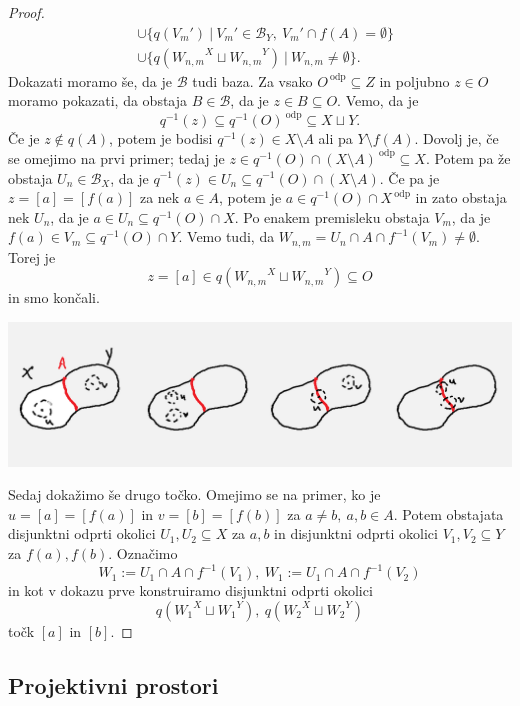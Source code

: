 \documentclass[10pt, a4paper]{article}
\newenvironment{noticeC}{%
  \tcolorbox[%
  notitle,
  empty,
  enhanced,  %
  breakable,
  coltext=black, 
  fontupper=\rmfamily,
  noparskip,
  sharp corners,
  boxrule=-1pt,  %
  frame hidden,
  left=7pt,  %
  right=7pt,
  top=5pt,
  bottom=5pt,
  before skip=2.5ex plus 2pt,
  after skip=2.5ex plus 2pt,
  overlay unbroken and last={%
  },
  ]}
{\endtcolorbox}
\newenvironment{dokaz}%
  {\begin{noticeC}\begin{proof}}%
  {\end{proof}\end{noticeC}}
\begin{document}
\begin{dokaz}
\begin{align*}
    &\cup \{q(V_m')\ |\ V_m' \in \mathcal{B}_Y,\ V_m' \cap f(A) = \emptyset\}\\
    &\cup \{q({W_{n, m} }^{X} \sqcup {W_{n, m} }^{Y})\ |\ W_{n, m} \neq \emptyset\}.
  \end{align*}
  Dokazati moramo še, da je $\mathcal{B}$ tudi baza.
  Za vsako $O^{\ \text{odp}} \subseteq Z$ in poljubno $z \in O$ moramo 
  pokazati, da obstaja $B \in \mathcal{B}$, da je $z \in B \subseteq O$.
  Vemo, da je $$q^{-1} (z) \subseteq q^{-1} (O)^{\ \text{odp}} \subseteq X \sqcup Y.$$
  Če je $z \notin q(A)$, potem je bodisi $q^{-1} (z) \in X \setminus A$ ali pa $Y \setminus f(A)$.
  Dovolj je, če se omejimo na prvi primer; tedaj je $z \in q^{-1} (O) \cap (X \setminus A)^{\ \text{odp}} \subseteq X$.
  Potem pa že obstaja $U_n \in \mathcal{B}_X$, da je $q^{-1}(z) \in U_n \subseteq q^{-1} (O) \cap (X \setminus A)$.
  Če pa je $z = [a] = [f(a)]$ za nek $a \in A$, potem je 
  $a \in q^{-1} (O) \cap X^{\ \text{odp}}$ in zato obstaja nek $U_n$,
  da je $a \in U_n \subseteq q^{-1} (O) \cap X$. Po enakem premisleku obstaja $V_m$,
  da je $f(a) \in V_m \subseteq q^{-1} (O) \cap Y$. Vemo tudi, da $W_{n,m} = U_n \cap A \cap f^{-1}(V_m) \neq \emptyset$.
  Torej je $$z = [a] \in q({W_{n, m} }^X \sqcup {W_{n, m} }^Y) \subseteq O$$
  in smo končali.
  \begin{center}
    \includegraphics[scale=0.75]{dokaz2.png}
  \end{center}
  Sedaj dokažimo še drugo točko. Omejimo se na primer, ko je 
  $u = [a] = [f(a)]$ in $v = [b] = [f(b)]$ za $a \neq b,\ a, b \in A$.
  Potem obstajata disjunktni odprti okolici $U_1, U_2 \subseteq X$ za $a, b$
  in disjunktni odprti okolici $V_1, V_2 \subseteq Y$ za $f(a), f(b)$.
  Označimo 
  $$W_1 := U_1 \cap A \cap f^{-1} (V_1),\ W_1 := U_1 \cap A \cap f^{-1} (V_2)$$
  in kot v dokazu prve konstruiramo disjunktni odprti okolici 
  $$q({W_1 }^{X} \sqcup {W_1 }^{Y}),\ q({W_2 }^{X} \sqcup {W_2 }^{Y})$$
  točk $[a]$ in $[b]$.
\end{dokaz}

\subsection{Projektivni prostori}
\end{document}
